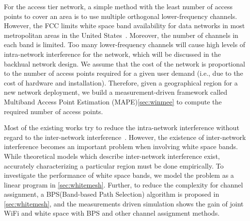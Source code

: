 For the access tier network, a simple method with the least number of access points to cover an area is to 
use multiple orthogonal lower-frequency channels. However, the FCC limits white space band availability 
for data networks in most metropolitan areas in the United States~\cite{googledatabase}. Moreover, the 
number of channels in each band is limited. Too many lower-frequency channels will cause high levels of 
intra-network interference for the network, which will be discussed in the backhual network design. We 
assume that the cost of the network is proportional to the number of access points required for a given 
user demand (i.e., due to the cost of hardware and installation). Therefore, given a geographical region for 
a new network deployment, we build a measurement-driven framework called Multiband Access Point Estimation 
(MAPE)\ref{sec:winmee} to compute the required number of access points.


Most of the existing works try to reduce the intra-network interference without regard to the inter-network 
interference~\cite{si2010overview}. However, the existence of inter-network interference becomes an important 
problem when involving white space bands.  While theoretical models which describe inter-network interference 
exist, accurately characterizing a particular region must be done empirically. To investigate the performance 
of white space bands, we model the problem as a linear program in \ref{sec:whitemesh}. Further, to reduce the 
complexity for channel assignment, a BPS(Band-based Path Selection) algorithm is proposed in \ref{sec:whitemesh}, and
the measurements driven simulation shows the gain of joint WiFi and white space with BPS and other channel assignment
methods.


